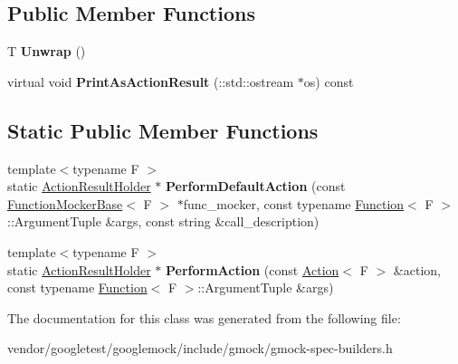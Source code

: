 \subsection*{Public Member Functions}
\begin{DoxyCompactItemize}
\item 
\mbox{\label{classtesting_1_1internal_1_1_action_result_holder_a057df6cceeeab9ea06e679bcf6b78960}} 
T {\bfseries Unwrap} ()
\item 
\mbox{\label{classtesting_1_1internal_1_1_action_result_holder_a06d1fb40fc863328dbcc102bc46dece4}} 
virtual void {\bfseries Print\+As\+Action\+Result} (\+::std\+::ostream $\ast$os) const
\end{DoxyCompactItemize}
\subsection*{Static Public Member Functions}
\begin{DoxyCompactItemize}
\item 
\mbox{\label{classtesting_1_1internal_1_1_action_result_holder_a9609dcb5fb16271f83d777b087075272}} 
{\footnotesize template$<$typename F $>$ }\\static \mbox{\hyperlink{classtesting_1_1internal_1_1_action_result_holder}{Action\+Result\+Holder}} $\ast$ {\bfseries Perform\+Default\+Action} (const \mbox{\hyperlink{classtesting_1_1internal_1_1_function_mocker_base}{Function\+Mocker\+Base}}$<$ F $>$ $\ast$func\+\_\+mocker, const typename \mbox{\hyperlink{structtesting_1_1internal_1_1_function}{Function}}$<$ F $>$\+::Argument\+Tuple \&args, const string \&call\+\_\+description)
\item 
\mbox{\label{classtesting_1_1internal_1_1_action_result_holder_a9e10aff754b5caf69b14964f3c9c79ec}} 
{\footnotesize template$<$typename F $>$ }\\static \mbox{\hyperlink{classtesting_1_1internal_1_1_action_result_holder}{Action\+Result\+Holder}} $\ast$ {\bfseries Perform\+Action} (const \mbox{\hyperlink{classtesting_1_1_action}{Action}}$<$ F $>$ \&action, const typename \mbox{\hyperlink{structtesting_1_1internal_1_1_function}{Function}}$<$ F $>$\+::Argument\+Tuple \&args)
\end{DoxyCompactItemize}


The documentation for this class was generated from the following file\+:\begin{DoxyCompactItemize}
\item 
vendor/googletest/googlemock/include/gmock/gmock-\/spec-\/builders.\+h\end{DoxyCompactItemize}
